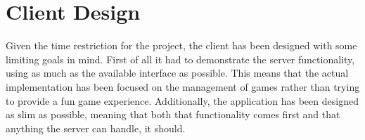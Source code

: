 \section{Client Design}\label{sec:desClient}
Given the time restriction for the project, the client has been designed with some limiting goals in mind. First of all it had to demonstrate the server functionality, using as much as the available interface as possible. This means that the actual implementation has been focused on the management of games rather than trying to provide a fun game experience. Additionally, the application has been designed as slim as possible, meaning that both that functionality comes first and that anything the server can handle, it should.


